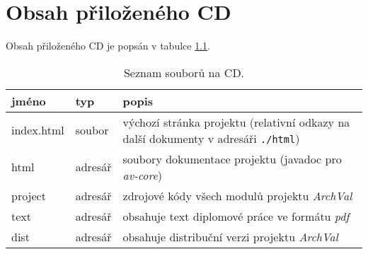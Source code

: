 \chapter{Obsah přiloženého CD}

Obsah přiloženého CD je popsán v tabulce \ref{cd_files_table}.

\begin{table}[ht]
  \centering
  \begin{tabular}{|l|l|p{20em}|}
    \hline
    jméno & typ & popis \\
    \hline
    \hline
    index.html & soubor & výchozí stránka projektu (relativní odkazy na další dokumenty v adresáři \verb+./html+) \\
    \hline
    html & adresář & soubory dokumentace projektu (javadoc pro \emph{av-core}) \\
    \hline
    project & adresář & zdrojové kódy všech modulů projektu \emph{ArchVal} \\
    \hline
    text & adresář & obsahuje text diplomové práce ve formátu \emph{pdf} \\
    \hline
    dist & adresář & obsahuje distribuční verzi projektu \emph{ArchVal} \\
    \hline
  \end{tabular}
  \caption{Seznam souborů na CD. \label{cd_files_table}}
\end{table}
